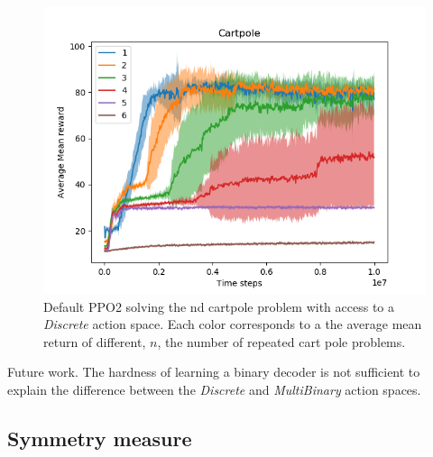 \begin{figure}[h!]
\centering
\includegraphics[width=1\textwidth,height=0.5\textheight]{../../pictures/figures/discrete-nd-cart.png}
\caption{Default PPO2 solving the nd cartpole problem with access to a \textit{Discrete} action space. Each color corresponds to a the average mean return of different, $n$, the number of repeated cart pole problems.}
\end{figure}






Future work. The hardness of learning a binary decoder is not sufficient to explain the difference between the
\textit{Discrete} and \textit{MultiBinary} action spaces.


\subsection{Symmetry measure}



